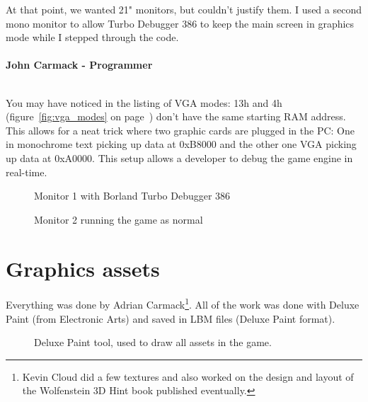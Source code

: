 \documentclass[book.tex]{subfiles}
\begin{document}
\begin{fancyquotes}
At that point, we wanted 21" monitors, but couldn't justify them.  I used a second mono monitor to allow Turbo Debugger 386 to keep the main screen in graphics mode while I stepped through the code.\\
 \\
\textbf{John Carmack - Programmer}
\end{fancyquotes}
\\
You may have noticed in the listing of VGA modes: 13h and 4h (figure~\ref{fig:vga_modes} on page~\pageref{fig:vga_modes})  don't have the same starting RAM address. This allows for a neat trick where two graphic cards are plugged in the PC: One in monochrome text picking up data at 0xB8000 and the other one VGA picking up data at 0xA0000. This setup allows a developer to debug the game engine in real-time.\\
\begin{figure}[H]
\centering
\caption{Monitor 1 with Borland Turbo Debugger 386}
\label{fig:dm1}
\end{figure}

\begin{figure}[H]
\centering
\caption{Monitor 2 running the game as normal}
\label{fig:dm1}
\end{figure}



 
 
 




\section{Graphics assets}

Everything was done by Adrian Carmack\footnote{Kevin Cloud did a few textures and also worked on the design and layout of the Wolfenstein 3D Hint book published eventually.}. All of the work was done with Deluxe Paint (from Electronic Arts) and saved in LBM files (Deluxe Paint format). 

\begin{figure}[H]
  \centering
 \caption{Deluxe Paint tool, used to draw all assets in the game.}
\end{figure}
\end{document}
